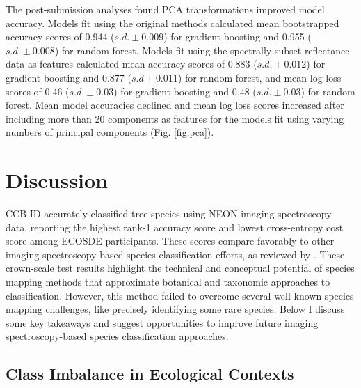 The post-submission analyses found PCA transformations improved model accuracy. Models fit using the original methods calculated mean bootstrapped accuracy scores of 0.944 ($s.d. \pm 0.009$) for gradient boosting and 0.955 ($s.d. \pm 0.008$) for random forest. Models fit using the spectrally-subset reflectance data as features calculated mean accuracy scores of 0.883 ($s.d. \pm 0.012$) for gradient boosting and 0.877 ($s.d \pm 0.011$) for random forest, and mean log loss scores of 0.46 ($s.d. \pm 0.03$) for gradient boosting and 0.48 ($s.d. \pm 0.03$) for random forest. Mean model accuracies declined and mean log loss scores increased after including more than 20 components as features for the models fit using varying numbers of principal components (Fig. \ref{fig:pca}).

\section{Discussion}

CCB-ID accurately classified tree species using NEON imaging spectroscopy data, reporting the highest rank-1 accuracy score and lowest cross-entropy cost score among ECOSDE participants. These scores compare favorably to other imaging spectroscopy-based species classification efforts, as reviewed by \cite{Fassnacht2016-qb}. These crown-scale test results highlight the technical and conceptual potential of species mapping methods that approximate botanical and taxonomic approaches to classification. However, this method failed to overcome several well-known species mapping challenges, like precisely identifying some rare species. Below I discuss some key takeaways and suggest opportunities to improve future imaging spectroscopy-based species classification approaches.

\subsection{Class Imbalance in Ecological Contexts}

